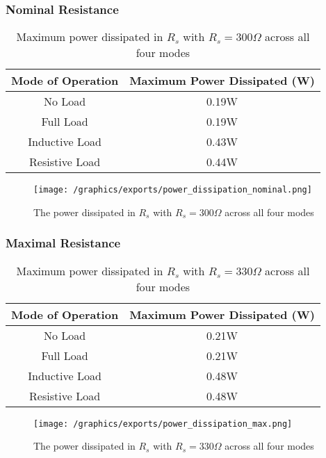 \subsubsection{Nominal Resistance}
\begin{table}[H]
\centering
\begin{tabular}{|c|c|}\hline
	\textbf{Mode of Operation} & \textbf{Maximum Power Dissipated (W)} \\\hline
	No Load & 0.19W \\
	Full Load &  0.19W \\
	Inductive Load & 0.43W \\
	Resistive Load & 0.44W \\\hline
\end{tabular}
\caption{Maximum power dissipated in $R_s$ with $R_s = 300\Omega$ across all four modes}
\end{table}
\begin{figure}[H]
	\centering
	\texttt{[image: /graphics/exports/power\_dissipation\_nominal.png]}
	\caption{The power dissipated in $R_s$ with $R_s = 300\Omega$ across all four modes}
\end{figure}

\subsubsection{Maximal Resistance}
\begin{table}[H]
\centering
\begin{tabular}{|c|c|}\hline
	\textbf{Mode of Operation} & \textbf{Maximum Power Dissipated (W)} \\\hline
	No Load & 0.21W \\
	Full Load &  0.21W \\
	Inductive Load & 0.48W \\
	Resistive Load & 0.48W \\\hline
\end{tabular}
\caption{Maximum power dissipated in $R_s$ with $R_s = 330\Omega$ across all four modes}
\end{table}

\begin{figure}[H]
	\centering
	\texttt{[image: /graphics/exports/power\_dissipation\_max.png]}
	\caption{The power dissipated in $R_s$ with $R_s = 330\Omega$ across all four modes}
\end{figure}